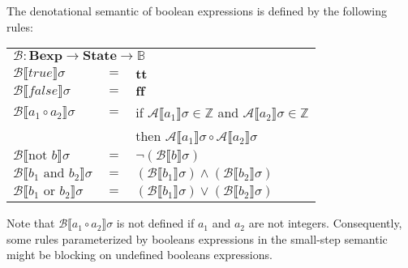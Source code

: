 \documentclass{article}
\begin{document}
The denotational semantic of boolean expressions is defined by the following rules:
\begin{center}
\begin{tabular}{ l c l }
\multicolumn{3}{l}{\(\mathcal{B}: \textbf{Bexp} \rightarrow \textbf{State} \rightarrow \mathbb{B}\)} \\
 \(\mathcal{B}\llbracket true \rrbracket \sigma \) & \(=\) & \(\textbf{tt}\)\\ 
 \(\mathcal{B}\llbracket false \rrbracket \sigma \) & \(=\) & \(\textbf{ff}\)\\  
 \(\mathcal{B}\llbracket a_1 \circ a_2 \rrbracket \sigma \) & \(=\) &
    if \(\mathcal{A}\llbracket a_1\rrbracket \sigma \in \mathbb{Z}\) and \(\mathcal{A}\llbracket a_2\rrbracket \sigma \in \mathbb{Z}\)\\
    & & then \(\mathcal{A}\llbracket a_1\rrbracket \sigma \circ \mathcal{A}\llbracket a_2\rrbracket \sigma\)\\ 
 \(\mathcal{B}\llbracket \text{not } b \rrbracket \sigma \) & \(=\) & \(\neg(\mathcal{B}\llbracket b \rrbracket \sigma)\) \\
 \(\mathcal{B}\llbracket b_1 \text{ and } b_2 \rrbracket \sigma \) & \(=\) &
    \((\mathcal{B}\llbracket b_1 \rrbracket \sigma) \wedge (\mathcal{B}\llbracket b_2 \rrbracket \sigma)\) \\
 \(\mathcal{B}\llbracket b_1 \text{ or } b_2 \rrbracket \sigma \) & \(=\) &
    \((\mathcal{B}\llbracket b_1 \rrbracket \sigma) \vee (\mathcal{B}\llbracket b_2 \rrbracket \sigma)\) \\
\end{tabular}
\end{center}
Note that  \(\mathcal{B}\llbracket a_1 \circ a_2 \rrbracket \sigma \) is not defined if \(a_1\) and \(a_2\) are not integers.
Consequently, some rules parameterized by booleans expressions in the small-step semantic might be blocking on undefined booleans expressions.
\end{document}
